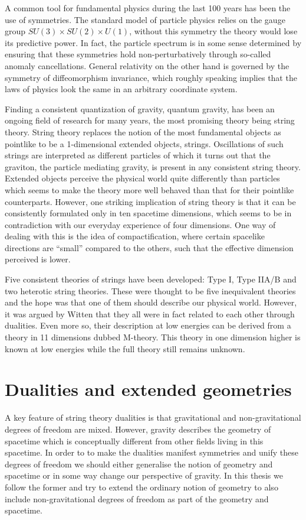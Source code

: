 A common tool for fundamental physics during the last 100 years has been the use of symmetries. The standard model of particle physics relies on the gauge group $SU(3)\times SU(2)\times U(1)$, without this symmetry the theory would lose its predictive power. In fact, the particle spectrum is in some sense determined by ensuring that these symmetries hold non-perturbatively through so-called anomaly cancellations. General relativity on the other hand is governed by the symmetry of diffeomorphism invariance, which roughly speaking implies that the laws of physics look the same in an arbitrary coordinate system. 

Finding a consistent quantization of gravity, quantum gravity, has been an ongoing field of research for many years, the most promising theory being string theory. String theory replaces the notion of the most fundamental objects as pointlike to be a 1-dimensional extended objects, strings. Oscillations of such strings are interpreted as different particles of which it turns out that the graviton, the particle mediating gravity, is present in any consistent string theory. Extended objects perceive the physical world quite differently than particles which seems to make the theory more well behaved than that for their pointlike counterparts. However, one striking implication of string theory is that it can be consistently formulated only in ten spacetime dimensions, which seems to be in contradiction with our everyday experience of four dimensions. One way of dealing with this is the idea of compactification, where certain spacelike directions are ``small'' compared to the others, such that the effective dimension perceived is lower. 

Five consistent theories of strings have been developed: Type I, Type IIA/B and two heterotic string theories. These were thought to be five inequivalent theories and the hope was that one of them should describe our physical world. However, it was argued by Witten \cite{WittenDualities1995} that they all were in fact related to each other through dualities. Even more so, their description at low energies can be derived from a theory in 11 dimensions dubbed M-theory. This theory in one dimension higher is known at low energies while the full theory still remains unknown.

\section{Dualities and extended geometries}
A key feature of string theory dualities is that gravitational and non-gravitational degrees of freedom are mixed. However, gravity describes the geometry of spacetime which is conceptually different from other fields living in this spacetime. In order to to make the dualities manifest symmetries and unify these degrees of freedom we should either generalise the notion of geometry and spacetime or in some way change our perspective of gravity. In this thesis we follow the former and try to extend the ordinary notion of geometry to also include non-gravitational degrees of freedom as part of the geometry and spacetime. 

